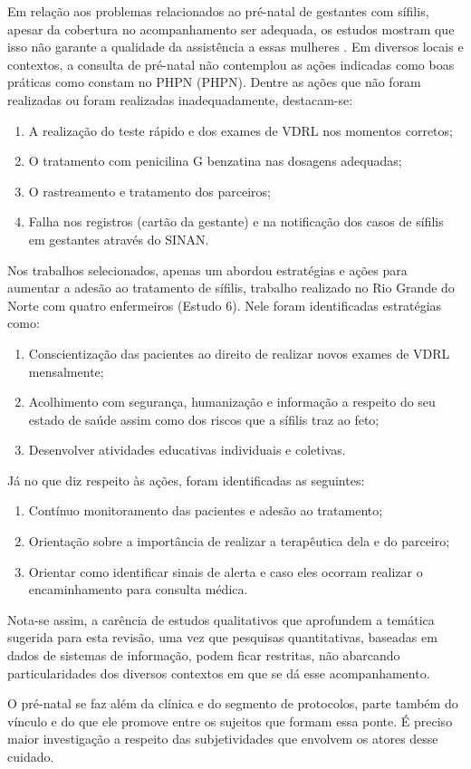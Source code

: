 Em relação aos problemas relacionados ao pré-natal  de gestantes com sífilis, apesar da cobertura no acompanhamento ser adequada, os estudos mostram que isso não garante a qualidade da assistência a essas mulheres \cite{tavares2012monitoramento,da2013sifilis,da2013sifilis}. Em diversos locais e contextos, a consulta de pré-natal não contemplou as ações indicadas como boas práticas como constam no \acrlong{PHPN} (\acrshort{PHPN}). Dentre as ações que não foram realizadas ou foram realizadas inadequadamente, destacam-se: 

\begin{enumerate}
\item A realização do teste rápido e dos exames de \acrshort{VDRL} nos momentos corretos;
\item O tratamento com penicilina G benzatina nas dosagens adequadas; 
\item O rastreamento e tratamento dos parceiros;
\item Falha nos registros (cartão da gestante) e na notificação dos casos de sífilis em gestantes através do \acrshort{SINAN}.
\end{enumerate}

Nos trabalhos selecionados, apenas um abordou estratégias e ações para aumentar a adesão ao tratamento de sífilis, trabalho realizado no Rio Grande do Norte com quatro enfermeiros (Estudo 6). Nele foram identificadas estratégias como: 

\begin{enumerate}
\item Conscientização das pacientes ao direito de realizar novos exames de VDRL mensalmente;
\item Acolhimento com segurança, humanização e informação a respeito do seu estado de saúde assim como dos riscos que a sífilis traz ao feto;
\item Desenvolver atividades educativas individuais e coletivas.
\end{enumerate}

Já no que diz respeito às ações, foram identificadas as seguintes: 

\begin{enumerate}
\item Contínuo monitoramento das pacientes e adesão ao tratamento; 
\item Orientação sobre a importância de realizar a terapêutica dela e do parceiro;
\item Orientar como identificar sinais de alerta e caso eles ocorram realizar o encaminhamento para consulta médica. 
\end{enumerate}

Nota-se assim, a carência de estudos qualitativos que aprofundem a temática sugerida para esta revisão, uma vez que pesquisas quantitativas, baseadas em dados de sistemas de informação, podem ficar restritas, não abarcando particularidades dos diversos contextos em que se dá esse acompanhamento. 

O pré-natal se faz além da clínica e do segmento de protocolos, parte também do vínculo e do que ele promove entre os sujeitos que formam essa ponte. É preciso maior investigação a respeito das subjetividades que envolvem os atores desse cuidado. 
